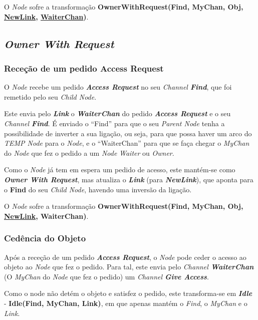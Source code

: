 O \emph{Node} sofre a transformação \textbf{OwnerWithRequest(Find, MyChan, Obj, \underline{NewLink}, \underline{WaiterChan})}.



\subsection*{\emph{Owner With Request}}
\label{especificacao:nodes:owner_with_request}

\subsubsection*{Receção de um pedido Access Request}
O \emph{Node} recebe um pedido \emph{\textbf{Access Request}} no seu \emph{Channel \textbf{Find}},
que foi remetido pelo seu \emph{Child Node}.

Este envia pelo \textbf{\emph{Link}} o \textbf{\emph{WaiterChan}} do pedido \emph{\textbf{Access Request}} e o seu \emph{Channel \textbf{Find}}.
É enviado o ``Find'' para que o seu \emph{Parent Node} tenha a possibilidade de inverter a sua ligação, ou seja, para que possa haver um arco do \emph{TEMP Node} para o \emph{Node}, 
e o ``WaiterChan'' para que se faça chegar o \emph{MyChan} do \emph{Node} que fez o pedido a um \emph{Node} \emph{Waiter} ou \emph{Owner}.

Como o \emph{Node} já tem em espera um pedido de acesso, este mantém-se como \emph{\textbf{Owner With Request}},
mas atualiza o \textbf{\emph{Link}} (para \textbf{\emph{NewLink}}),
que aponta para o \textbf{Find} do seu \emph{Child Node}, havendo uma inversão da ligação.

O \emph{Node} sofre a transformação \textbf{OwnerWithRequest(Find, MyChan, Obj, \underline{NewLink}, WaiterChan)}.


\subsubsection*{Cedência do Objeto}
Após a receção de um pedido \emph{\textbf{Access Request}}, o \emph{Node} pode ceder o acesso ao objeto ao \emph{Node} que fez o pedido.
Para tal, este envia pelo \emph{Channel \textbf{WaiterChan}} (O \emph{MyChan} do \emph{Node} que fez o pedido) um \emph{Channel \textbf{Give Access}}.

Como o node não detém o objeto e satisfez o pedido, este transforma-se em \emph{\textbf{Idle}} - \textbf{Idle(Find, MyChan, Link)}, em que apenas
mantém o \emph{Find}, o \emph{MyChan} e o \emph{Link}.





